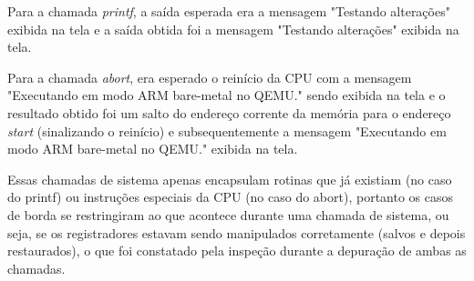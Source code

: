 Para a chamada \textit{printf}, a saída esperada era a mensagem "Testando alterações" exibida na tela e a saída obtida foi a mensagem "Testando alterações" exibida na tela.

Para a chamada \textit{abort}, era esperado o reinício da CPU com a mensagem "Executando em modo ARM bare-metal no QEMU." sendo exibida na tela e o resultado obtido foi um salto do endereço corrente da memória para o endereço \textit{start} (sinalizando o reinício) e subsequentemente a mensagem "Executando em modo ARM bare-metal no QEMU." exibida na tela.

Essas chamadas de sistema apenas encapsulam rotinas que já existiam (no caso do printf) ou instruções especiais da CPU (no caso do abort), portanto os casos de borda se restringiram ao que acontece durante uma chamada de sistema, ou seja, se os registradores estavam sendo manipulados corretamente (salvos e depois restaurados), o que foi constatado pela inspeção durante a depuração de ambas as chamadas.